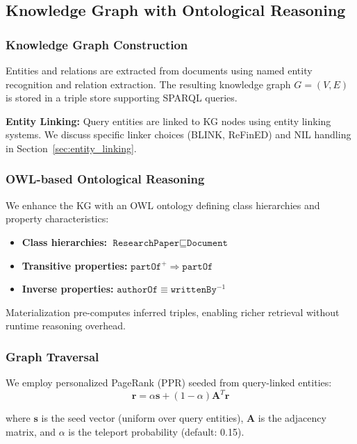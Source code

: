 \documentclass[11pt,a4paper]{article}
\begin{document}
\subsection{Knowledge Graph with Ontological Reasoning}
\label{sec:kg_retrieval}

\subsubsection{Knowledge Graph Construction}

Entities and relations are extracted from documents using named entity recognition and relation extraction. The resulting knowledge graph $G = (V, E)$ is stored in a triple store supporting SPARQL queries.

\textbf{Entity Linking:} Query entities are linked to KG nodes using entity linking systems. We discuss specific linker choices (BLINK, ReFinED) and NIL handling in Section~\ref{sec:entity_linking}.

\subsubsection{OWL-based Ontological Reasoning}

We enhance the KG with an OWL ontology defining class hierarchies and property characteristics:
\begin{itemize}
    \item \textbf{Class hierarchies:} $\texttt{ResearchPaper} \sqsubseteq \texttt{Document}$
    \item \textbf{Transitive properties:} $\texttt{partOf}^+ \Rightarrow \texttt{partOf}$
    \item \textbf{Inverse properties:} $\texttt{authorOf} \equiv \texttt{writtenBy}^{-1}$
\end{itemize}

Materialization pre-computes inferred triples, enabling richer retrieval without runtime reasoning overhead.

\subsubsection{Graph Traversal}

We employ personalized PageRank (PPR) seeded from query-linked entities:
\begin{equation}
\mathbf{r} = \alpha \mathbf{s} + (1 - \alpha) \mathbf{A}^T \mathbf{r}
\end{equation}

where $\mathbf{s}$ is the seed vector (uniform over query entities), $\mathbf{A}$ is the adjacency matrix, and $\alpha$ is the teleport probability (default: 0.15).
\end{document}
